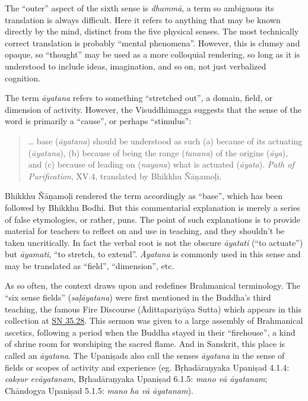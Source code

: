 \documentclass[12pt,openany]{book}%
\begin{document}
The “outer” aspect of the sixth sense is \textit{\textsanskrit{dhammā}}, a term so ambiguous its translation is always difficult. Here it refers to anything that may be known directly by the mind, distinct from the five physical senses. The most technically correct translation is probably “mental phenomena”. However, this is clumsy and opaque, so “thought” may be used as a more colloquial rendering, so long as it is understood to include ideas, imagination, and so on, not just verbalized cognition.

The term \textit{\textsanskrit{āyatana}} refers to something “stretched out”, a domain, field, or dimension of activity. However, the Visuddhimagga suggests that the sense of the word is primarily a “cause”, or perhaps “stimulus”:

\begin{quotation}%
… base (\textit{\textsanskrit{āyatana}}) should be understood as such (a) because of its actuating (\textit{\textsanskrit{āyatana}}), (b) because of being the range (\textit{tanana}) of the origins (\textit{\textsanskrit{āya}}), and (c) because of leading on (\textit{nayana}) what is actuated (\textit{\textsanskrit{āyata}}). \textit{Path of Purification}, XV.4, translated by Bhikkhu \textsanskrit{Ñāṇamoḷi}.

%
\end{quotation}

Bhikkhu \textsanskrit{Ñāṇamoḷi} rendered the term accordingly as “base”, which has been followed by Bhikkhu Bodhi. But this commentarial explanation is merely a series of false etymologies, or rather, puns. The point of such explanations is to provide material for teachers to reflect on and use in teaching, and they shouldn’t be taken uncritically. In fact the verbal root is not the obscure \textit{\textsanskrit{āyatati}} (“to actuate”) but \textit{\textsanskrit{āyamati}}, “to stretch, to extend”. \textit{Āyatana} is commonly used in this sense and may be translated as “field”, “dimension”, etc.

As so often, the context draws upon and redefines Brahmanical terminology. The “six sense fields” (\textit{\textsanskrit{saḷāyatana}}) were first mentioned in the Buddha’s third teaching, the famous Fire Discourse (\textsanskrit{Ādittapariyāya} Sutta) which appears in this collection at \href{https://suttacentral.net/sn35.28}{SN 35.28}. This sermon was given to a large assembly of Brahmanical ascetics, following a period when the Buddha stayed in their “firehouse”, a kind of shrine room for worshiping the sacred flame. And in Sanskrit, this place is called an \textit{\textsanskrit{āyatana}}. The \textsanskrit{Upaniṣads} also call the senses \textit{\textsanskrit{āyatana}} in the sense of fields or scopes of activity and experience (eg. \textsanskrit{Bṛhadāraṇyaka} \textsanskrit{Upaniṣad} 4.1.4: \textit{\textsanskrit{cakṣur} \textsanskrit{evāyatanam}}, \textsanskrit{Bṛhadāraṇyaka} \textsanskrit{Upaniṣad} 6.1.5: \textit{mano \textsanskrit{vā} \textsanskrit{āyatanam}}; \textsanskrit{Chāndogya} \textsanskrit{Upaniṣad} 5.1.5: \textit{mano ha \textsanskrit{vā} \textsanskrit{āyatanam}}).
\end{document}
